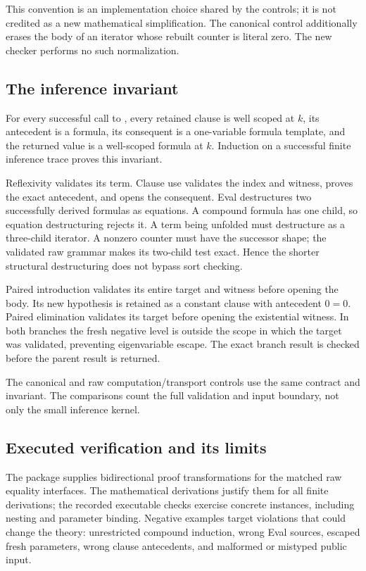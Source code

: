 This convention is an implementation choice shared by the controls; it
is not credited as a new mathematical simplification. The canonical
control additionally erases the body of an iterator whose rebuilt
counter is literal zero. The new checker performs no such normalization.

\subsection{The inference invariant}

For every successful call to , every retained clause
is well scoped at $k$, its antecedent is a formula, its consequent is a
one-variable formula template, and the returned value is a well-scoped
formula at $k$. Induction on a successful finite inference trace proves
this invariant.

Reflexivity validates its term. Clause use validates the index and
witness, proves the exact antecedent, and opens the consequent. Eval
destructures two successfully derived formulas as equations. A compound
formula has one child, so equation destructuring rejects it. A term being
unfolded must destructure as a three-child iterator. A nonzero counter
must have the successor shape; the validated raw grammar makes its
two-child test exact. Hence the shorter structural destructuring does
not bypass sort checking.

Paired introduction validates its entire target and witness before
opening the body. Its new hypothesis is retained as a constant clause
with antecedent $0=0$. Paired elimination validates its target before
opening the existential witness. In both branches the fresh negative
level is outside the scope in which the target was validated, preventing
eigenvariable escape. The exact branch result is checked before the
parent result is returned.

The canonical and raw computation/transport controls use the same
contract and invariant. The comparisons count the full validation and
input boundary, not only the small inference kernel.

\subsection{Executed verification and its limits}



The package supplies bidirectional proof transformations for the matched
raw equality interfaces. The mathematical derivations justify them for
all finite derivations; the recorded executable checks exercise concrete
instances, including nesting and parameter binding. Negative examples
target violations that could change the theory: unrestricted compound
induction, wrong Eval sources, escaped fresh parameters, wrong clause
antecedents, and malformed or mistyped public input.

